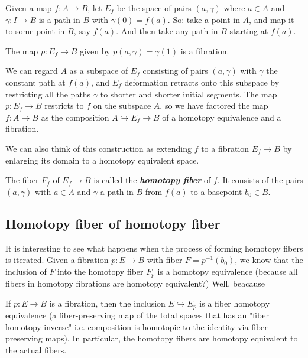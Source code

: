 \begin{remark}
\begin{defn}
\begin{defn}
	Given a map $f:A\to B$, let $E_f$ be the space of pairs $(a,\gamma)$ where $a\in A$ and $\gamma:I\to B$ is a path in $B$ with $\gamma(0)=f(a)$. {\color{blue}So: take a point in $A$, and map it to some point in $B$, say $f(a)$. And then take any path in $B$ starting at $f (a)$.}
\begin{prop}
	The map $p:E_f\to B$ given by $p(a,\gamma)=\gamma(1)$ is a fibration.
\end{prop}
We can regard $A$ as a subspace of $E_{f}$ consisting of pairs $(a,\gamma)$ with $\gamma$ the constant path at $f(a)$, and $E_f$ deformation retracts onto this subspace by restricting all the paths $\gamma$ to shorter and shorter initial segments. The map $p:E_f\to B$ restricts to $f$ on the subspace $A$, so we have factored the map $f:A\to B$ as the composition $A\hookrightarrow E_f\to B$ of a homotopy equivalence and a fibration.

We can also think of this construction as extending $f$ to a fibration $E_f\to B$ by enlarging its domain to a homotopy equivalent space.

The fiber $F_f$ of $E_f\to B$ is called the \textit{\textbf{homotopy fiber}} of $f$. It consists of the pairs $(a,\gamma)$ with $a\in A$ and $\gamma$ a path in $B$ from $f(a)$ to a basepoint $b_0\in B$.
\end{defn}

\subsection{Homotopy fiber of homotopy fiber}

It is interesting to see what happens when the process of forming homotopy fibers is iterated. Given a fibration $p:E\to B$ with fiber $F=p^{-1} (b_0)$, we know that the inclusion of $F$ into the homotopy fiber $F_{p}$ is a homotopy equivalence {\color{blue}(because all fibers in homotopy fibrations are homotopy equivalent?)} Well, beacause
\begin{prop}[4.66]
	If $p:E\to B$ is a fibration, then the inclusion $E\hookrightarrow E_p$ is a fiber homotopy equivalence (a fiber-preserving map of the total spaces that has an "fiber homotopy inverse" i.e. composition is homotopic to the identity via fiber-preserving maps). In particular, the homotopy fibers are homotopy equivalent to the actual fibers.
\end{prop}


\end{defn}
\end{remark}
